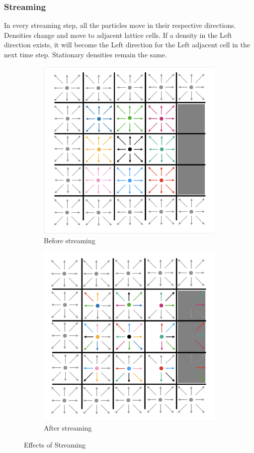 \documentclass[12pt]{article}
\begin{document}
\subsubsection{Streaming}
In every streaming step, all the particles move in their respective directions. Densities change and move to adjacent lattice cells. If a density in the Left direction exists, it will become the Left direction for the Left adjacent cell in the next time step. Stationary densities remain the same.
\begin{figure}[hbt!]
\centering
\begin{subfigure}{0.4\textwidth}
  \centering
  \includegraphics[width=0.9\linewidth]{plot10.png}
  \caption{Before streaming}
  \label{fig:sub1}
\end{subfigure}%
\begin{subfigure}{0.4\textwidth}
  \centering
  \includegraphics[width=0.9\linewidth]{plot11.png}
  \caption{After streaming}
  \label{fig:sub2}
\end{subfigure}
\caption{Effects of Streaming}
\label{fig:test}
\end{figure}
\FloatBarrier 
\end{document}
